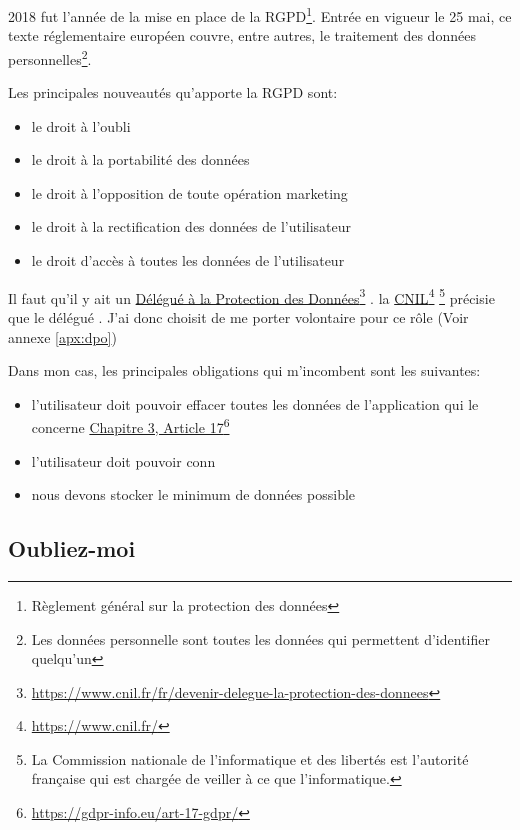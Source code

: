 \documentclass[]{report}
\newcommand\fnurl[2]{%
  \href{#1}{#2}\footnote{\url{#1}}%
}
\begin{document}
    2018 fut l'année de la mise en place de la RGPD\footnote{Règlement général sur la protection des données}. Entrée en vigueur le 25 mai, ce texte réglementaire européen couvre, entre autres, le traitement des données personnelles\footnote{Les données personnelle sont toutes les données qui permettent d'identifier quelqu'un}.

    Les principales nouveautés qu'apporte la RGPD sont:

    \begin{itemize}
      \item le droit à l'oubli
      \item le droit à la portabilité des données
      \item le droit à l'opposition de toute opération marketing
      \item le droit à la rectification des données de l'utilisateur
      \item le droit d'accès à toutes les données de l'utilisateur
    \end{itemize}

    Il faut qu'il y ait un \fnurl{https://www.cnil.fr/fr/devenir-delegue-la-protection-des-donnees}{Délégué à la Protection des Données}. la \fnurl{https://www.cnil.fr/}{CNIL}\footnote{La Commission nationale de l'informatique et des libertés est l'autorité française qui est chargée de veiller à ce que l’informatique.} précisie que le délégué . J'ai donc choisit de me porter volontaire pour ce rôle (Voir annexe \ref{apx:dpo})


    Dans mon cas, les principales obligations qui m'incombent sont les suivantes:

    \begin{itemize}
      \item l'utilisateur doit pouvoir effacer toutes les données de l'application qui le concerne \fnurl{https://gdpr-info.eu/art-17-gdpr/}{Chapitre 3, Article 17}
      \item l'utilisateur doit pouvoir conn
      \item nous devons stocker le minimum de données possible
    \end{itemize}


    \subsection{Oubliez-moi}
\end{document}
